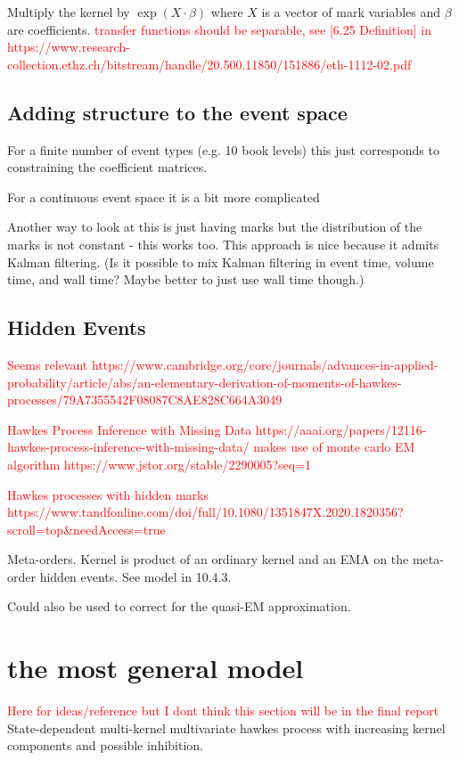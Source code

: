 \documentclass[honours,12pt]{unswthesis}
\numberwithin{equation}{section}
\begin{document}
Multiply the kernel by $\exp\left(X\cdot\beta\right)$ where $X$ is a vector of mark variables and $\beta$ are coefficients.
\textcolor{red}{transfer functions should be separable, see [6.25 Definition] in https://www.research-collection.ethz.ch/bitstream/handle/20.500.11850/151886/eth-1112-02.pdf}

\subsection{Adding structure to the event space}
For a finite number of event types (e.g. 10 book levels) this just corresponds to constraining the coefficient matrices.

For a continuous event space it is a bit more complicated


Another way to look at this is just having marks but the distribution of the marks is not constant - this works too. This approach is nice because it admits Kalman filtering. (Is it possible to mix Kalman filtering in event time, volume time, and wall time? Maybe better to just use wall time though.)

\subsection{Hidden Events}
\textcolor{red}{Seems relevant https://www.cambridge.org/core/journals/advances-in-applied-probability/article/abs/an-elementary-derivation-of-moments-of-hawkes-processes/79A7355542F08087C8AE828C664A3049}

\textcolor{red}{Hawkes Process Inference with Missing Data https://aaai.org/papers/12116-hawkes-process-inference-with-missing-data/ makes use of monte carlo EM algorithm https://www.jstor.org/stable/2290005?seq=1}

\textcolor{red}{Hawkes processes with hidden marks https://www.tandfonline.com/doi/full/10.1080/1351847X.2020.1820356?scroll=top&needAccess=true}

Meta-orders. Kernel is product of an ordinary kernel and an EMA on the meta-order hidden events. See model in \cite{BouchaudEtAl} 10.4.3.

Could also be used to correct for the quasi-EM approximation.

\section{the most general model}
\textcolor{red}{Here for ideas/reference but I dont think this section will be in the final report}
State-dependent multi-kernel multivariate hawkes process with increasing kernel components and possible inhibition.
\end{document}
